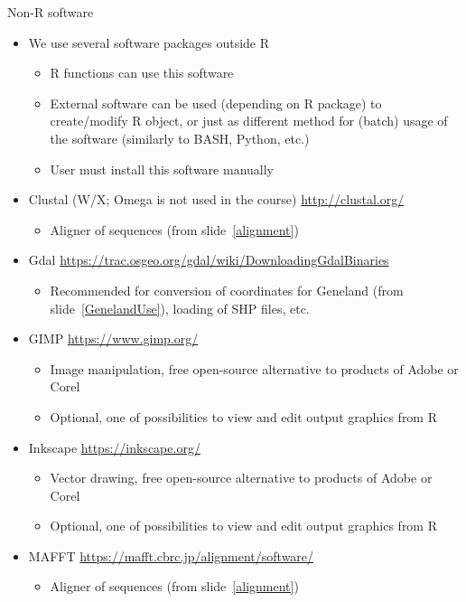 \documentclass[compress, ucs, xelatex, 11pt, xcolor=svgnames, aspectratio=169,
	hyperref={
		bookmarks=true,
		unicode=true,
		colorlinks=true,
		pdftitle={Molecular data in R},
		plainpages=false,
		pdfauthor={Vojtech Zeisek},
		pdfsubject={Course about phylogeny and evolution in R},
		pdfcreator={XeLaTeX},
		pdfkeywords={R, evolution, phylogeny, molecular data},
		linkcolor=Crimson, %
		anchorcolor=Magenta, %
		citecolor=Magenta, %
		filecolor=Magenta, %
		menucolor=Magenta, %
		urlcolor=DodgerBlue, %
		pdftex},
	url={hyphens, lowtilde} %
	]{beamer}
\begin{document}
\begin{frame}[allowframebreaks]{Non-R software}
	\begin{itemize}
		\item We use several software packages outside R
		\begin{itemize}
			\item R functions can use this software
			\item External software can be used (depending on R package) to create/modify R object, or just as different method for (batch) usage of the software (similarly to BASH, Python, etc.)
			\item User must install this software manually
		\end{itemize}
		\item Clustal (W/X; Omega is not used in the course) \url{http://clustal.org/}
		\begin{itemize}
			\item Aligner of sequences (from slide~\ref{alignment})
		\end{itemize}
		\item Gdal \url{https://trac.osgeo.org/gdal/wiki/DownloadingGdalBinaries}
		\begin{itemize}
			\item Recommended for conversion of coordinates for Geneland (from slide~\ref{GenelandUse}), loading of SHP files, etc.
		\end{itemize}
		\item GIMP \url{https://www.gimp.org/}
		\begin{itemize}
			\item Image manipulation, free open-source alternative to products of Adobe or Corel
			\item Optional, one of possibilities to view and edit output graphics from R
		\end{itemize}
		\item Inkscape \url{https://inkscape.org/}
		\begin{itemize}
			\item Vector drawing, free open-source alternative to products of Adobe or Corel
			\item Optional, one of possibilities to view and edit output graphics from R
		\end{itemize}
		\item MAFFT \url{https://mafft.cbrc.jp/alignment/software/}
		\begin{itemize}
			\item Aligner of sequences (from slide~\ref{alignment})

\end{itemize}
\end{itemize}
\end{frame}
\end{document}
